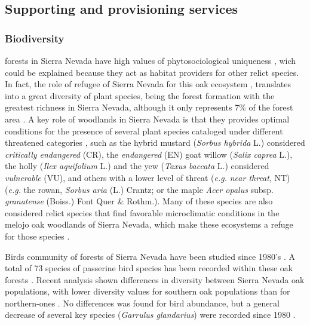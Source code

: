 \subsection{Supporting and provisioning services}\label{sec:es:provision}
\subsubsection{Biodiversity}\label{sec:es:provision-biodiversity}

\Qp forests in Sierra Nevada have high values of phytosociological uniqueness \autocites{Loriteetal2008PhytosociologicalReview}, wich could be explained because they act as habitat providers for other relict species. In fact, the role of refugee of Sierra Nevada for this oak ecosystem \autocites{Breweretal2002SpreadDeciduous,Olaldeetal2002WhiteOaks,RodriguezSanchezetal2010TreeRange}, translates into a great diversity of plant species, being the forest formation with the greatest richness in Sierra Nevada, although it only represents 7\% of the forest area \autocites{PerezLuqueetal2014SinfonevadaDataset}. A key role of \Qp woodlands in Sierra Nevada is that they provides optimal conditions for the presence of several plant species cataloged under different threatened categories \autocites{Lorite2016UpdatedChecklist,Losaetal1986PaisajeVegetal,MelendoValle2000EstudioComparativo}, such as the hybrid mustard (\emph{Sorbus hybrida} L.) considered \emph{critically endangered} (CR), the \emph{endangered} (EN) goat willow (\emph{Salix caprea} L.), the holly (\emph{Ilex aquifolium} L.) and the yew (\emph{Taxus baccata} L.) considered \emph{vulnerable} (VU), and others with a lower level of threat (\emph{e.g.} \emph{near threat}, NT) (\emph{e.g.} the rowan, \emph{Sorbus aria} (L.) Crantz; or the maple \emph{Acer opalus} subsp. \emph{granatense} (Boiss.) Font Quer \& Rothm.). Many of these species are also considered relict species that find favorable microclimatic conditions in the melojo oak woodlands of Sierra Nevada, which make these ecosystems a refuge for those species \autocites{Blancaetal1998ThreatenedVascular,Lorite2016UpdatedChecklist,Losaetal1986PaisajeVegetal}. 

Birds community of \Qp forests of Sierra Nevada have been studied since 1980's \autocites{ZamoraCamacho1984EvolucionEstacional,ZamoraBareaAzcon2015LongTermChanges,BareaAzconetal2012PasseriformesOtras}. A total of 73 species of passerine bird species has been recorded within these oak forests \autocites{PerezLuqueetal2016DatasetPasserine}. Recent analysis shown differences in diversity between Sierra Nevada oak populations, with lower diversity values for southern oak populations than for northern-ones \autocites{PerezLuqueetal2021ManualGestion}. No differences was found for bird abundance, but a general decrease of several key species (\emph{Garrulus glandarius}) were recorded since 1980 \autocites{ZamoraBareaAzcon2015LongTermChanges}. 

